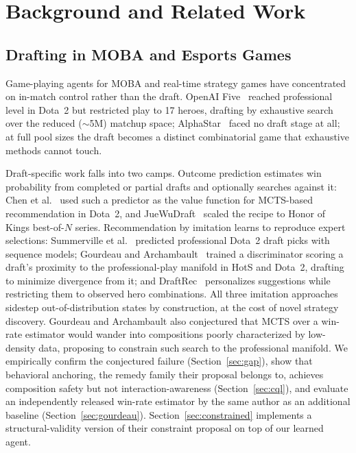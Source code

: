 \documentclass[journal]{IEEEtran}
\begin{document}
\section{Background and Related Work}

\subsection{Drafting in MOBA and Esports Games}

Game-playing agents for MOBA and real-time strategy games have concentrated on in-match control rather than the draft. OpenAI Five~\cite{berner2019dota} reached professional level in Dota~2 but restricted play to 17 heroes, drafting by exhaustive search over the reduced ($\sim$5M) matchup space; AlphaStar~\cite{vinyals2019grandmaster} faced no draft stage at all; at full pool sizes the draft becomes a distinct combinatorial game that exhaustive methods cannot touch.

Draft-specific work falls into two camps. Outcome prediction estimates win probability from completed or partial drafts and optionally searches against it: Chen et al.~\cite{chen2018drafting} used such a predictor as the value function for MCTS-based recommendation in Dota~2, and JueWuDraft~\cite{chen2021juewudraft} scaled the recipe to Honor of Kings best-of-$N$ series. Recommendation by imitation learns to reproduce expert selections: Summerville et al.~\cite{summerville2016draft} predicted professional Dota~2 draft picks with sequence models; Gourdeau and Archambault~\cite{gourdeau2021discriminative} trained a discriminator scoring a draft's proximity to the professional-play manifold in HotS and Dota~2, drafting to minimize divergence from it; and DraftRec~\cite{lee2022draftrec} personalizes suggestions while restricting them to observed hero combinations. All three imitation approaches sidestep out-of-distribution states by construction, at the cost of novel strategy discovery. Gourdeau and Archambault also conjectured that MCTS over a win-rate estimator would wander into compositions poorly characterized by low-density data, proposing to constrain such search to the professional manifold. We empirically confirm the conjectured failure (Section~\ref{sec:gap}), show that behavioral anchoring, the remedy family their proposal belongs to, achieves composition safety but not interaction-awareness (Section~\ref{sec:cql}), and evaluate an independently released win-rate estimator by the same author as an additional baseline (Section~\ref{sec:gourdeau}). Section~\ref{sec:constrained} implements a structural-validity version of their constraint proposal on top of our learned agent.
\end{document}
